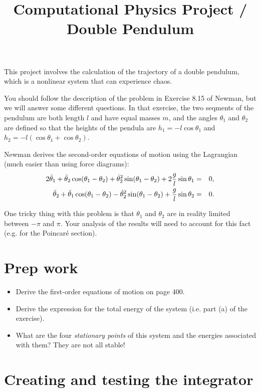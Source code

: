 \documentclass[11pt, preprint]{aastex}
\begin{document}
\title{\bf Computational Physics Project / Double Pendulum}

This project involves the calculation of the trajectory of a double
pendulum, which is a nonlinear system that can experience chaos. 

You should follow the description of the problem in Exercise 8.15 of
Newman, but we will answer some different questions. In that exercise,
the two seqments of the pendulum are both length $l$ and have equal
masses $m$, and the angles $\theta_1$ and $\theta_2$ are defined so
that the heights of the pendula are $h_1 = - l \cos\theta_1$ and $h_2
= - l (\cos\theta_1 + \cos\theta_2)$.

Newman derives the second-order equations of motion using the
Lagrangian (much easier than using force diagrams):
\begin{eqnarray}
2 \ddot\theta_1 + \ddot\theta_2 \cos(\theta_1 - \theta_2) +
\dot\theta_2^2\sin(\theta_1 - \theta_2) + 2 \frac{g}{l} \sin\theta_1
&=& 0, \cr
\ddot\theta_2 + \ddot\theta_1 \cos(\theta_1 - \theta_2) -
\dot\theta_2^2\sin(\theta_1 - \theta_2) + \frac{g}{l} \sin\theta_2
&=& 0.
\end{eqnarray}

One tricky thing with this problem is that $\theta_1$ and $\theta_2$
are in reality limited between $-\pi$ and $\pi$. Your analysis of the
results will need to account for this fact (e.g. for the Poincar{\'e}
section).

\section{Prep work}

\begin{itemize}
\item Derive the first-order equations of motion on page 400.
\item Derive the expression for the total energy of the system
  (i.e. part (a) of the exercise).
\item What are the four {\it stationary points} of this system and the
  energies associated with them? They are not all stable!
\end{itemize}

\section{Creating and testing the integrator}
\end{document}
